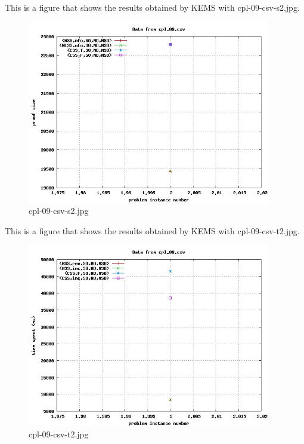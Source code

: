 This is a figure that shows the results obtained by KEMS with cpl-09-csv-s2.jpg.
\begin{figure}[htbp]
\begin{center}
\includegraphics[width=0.95\textwidth]{figuras/cpl-09-csv-s2.jpg}
\end{center}
\caption{cpl-09-csv-s2.jpg}
\end{figure}

This is a figure that shows the results obtained by KEMS with cpl-09-csv-t2.jpg.
\begin{figure}[htbp]
\begin{center}
\includegraphics[width=0.95\textwidth]{figuras/cpl-09-csv-t2.jpg}
\end{center}
\caption{cpl-09-csv-t2.jpg}
\end{figure}


